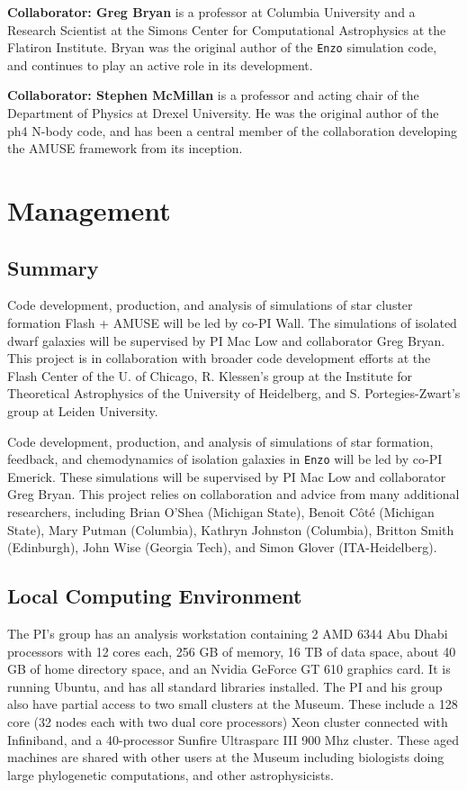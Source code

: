 \documentclass[11pt]{article}
\begin{document}
\textbf{Collaborator: Greg Bryan} is a professor at Columbia University and a Research Scientist at the Simons Center for Computational Astrophysics at the Flatiron Institute. Bryan was the original author of the \texttt{Enzo} simulation code, and continues to play an active role in its development. %

\textbf{Collaborator: Stephen McMillan} is a professor and acting chair of the Department of Physics at Drexel University.  He was the original author of the ph4 N-body code, and has been a central member of the collaboration developing the AMUSE framework from its inception.

\section{Management}

\subsection{Summary}

Code development, production, and analysis of simulations of star cluster formation Flash + AMUSE will be led by co-PI Wall. The simulations of isolated dwarf galaxies will be supervised by PI Mac Low and collaborator Greg Bryan. This project is in collaboration with broader code development efforts at the Flash Center of the U. of Chicago, R. Klessen's group at the Institute for Theoretical Astrophysics of the University of Heidelberg, and S. Portegies-Zwart's group at Leiden University.  

Code development, production, and analysis of simulations of star formation, feedback, and chemodynamics of isolation galaxies in \texttt{Enzo} will be led by co-PI Emerick. These simulations will be supervised by PI Mac Low and collaborator Greg Bryan. This project relies on collaboration and advice from many additional researchers, including Brian O'Shea (Michigan State), Benoit C{\^o}t{\'e} (Michigan State), Mary Putman (Columbia), Kathryn Johnston (Columbia), Britton Smith (Edinburgh), John Wise (Georgia Tech), and Simon Glover (ITA-Heidelberg).

\subsection{Local Computing Environment}

The PI's group has an analysis workstation containing  2 AMD 6344 Abu Dhabi processors with 12 cores each, 256 GB of memory, 16 TB of data space, about 40 GB of home directory space, and an Nvidia GeForce GT 610 graphics card. It is running Ubuntu, and has all standard libraries installed.  The PI and his group also have partial access to two small clusters at the Museum. These include a 128 core (32 nodes each with two dual core processors) Xeon cluster connected with Infiniband, and a 40-processor Sunfire Ultrasparc III 900 Mhz cluster. These aged machines are shared with other users at the Museum including biologists doing large phylogenetic computations, and other astrophysicists.
\end{document}
